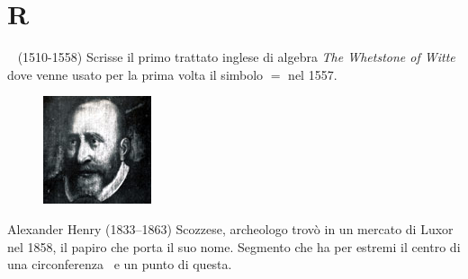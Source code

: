 \chapter{R}
\vspace{5mm} 
\pointsto~
 (1510-1558) Scrisse il primo trattato inglese di algebra \foreignlanguage{english}{\textit{The Whetstone of Witte}}  dove venne usato per la prima volta il simbolo $=$ nel  1557\cite{Kline1972}.
\begin{figure}
\centering{}
	\includegraphics[width=0.7\linewidth]{Figure/R/Robert_recorde}
	\label{fig:robertrecorde}
\end{figure}
Alexander Henry (1833–1863) Scozzese, archeologo trovò in un mercato di Luxor nel 1858, il papiro che porta il suo nome. 
Segmento che ha per estremi il centro di una circonferenza\pointsto~ e un punto di questa. 
